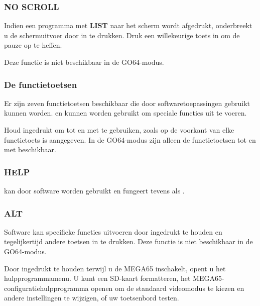 \subsubsection{NO SCROLL}
Indien een programma met {\bf LIST} naar het scherm wordt afgedrukt, onderbreekt u de schermuitvoer door  in te drukken. Druk een willekeurige toets in om de pauze op te heffen.

Deze functie is niet beschikbaar in de GO64-modus.

\subsubsection{De functietoetsen}
Er zijn zeven functietoetsen beschikbaar die door softwaretoepassingen gebruikt kunnen worden.       en  kunnen worden gebruikt om speciale functies uit te voeren.

Houd  ingedrukt om  tot en met  te gebruiken, zoals op de voorkant van elke functietoets is aangegeven.
In de GO64-modus zijn alleen de functietoetsen  tot en met  beschikbaar.

\subsubsection{HELP}
 kan door software worden gebruikt en fungeert tevens als .

\subsubsection{ALT}
Software kan specifieke functies uitvoeren door  ingedrukt te houden en tegelijkertijd andere toetsen in te drukken. Deze functie is niet beschikbaar in de GO64-modus.

Door  ingedrukt te houden terwijl u de MEGA65 inschakelt, opent u het hulpprogrammamenu. U kunt een SD-kaart formatteren, het MEGA65-configuratiehulpprogramma openen om de standaard videomodus te kiezen en andere instellingen te wijzigen, of uw toetsenbord testen.

